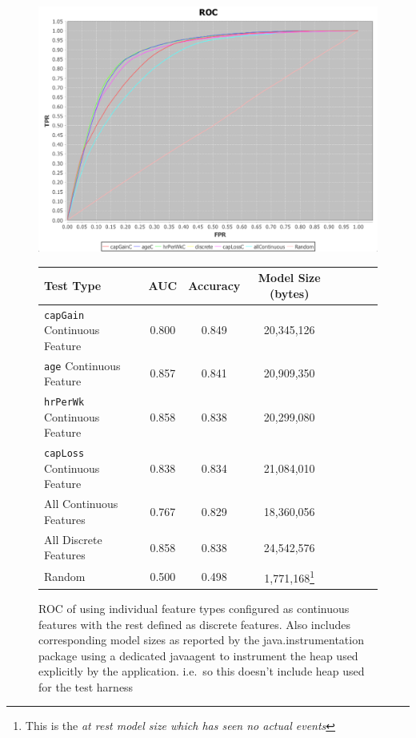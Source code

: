 \documentclass[a4paper,11pt]{scrreprt}
\begin{document}
\begin{figure}[h!]
\centering
\caption{ROC of using individual feature types configured as continuous features with the rest defined as discrete features. Also includes corresponding model sizes as reported by the java.instrumentation package using a dedicated javaagent to instrument the heap used explicitly by the application. i.e.\ so this doesn't include heap used for the test harness}
\includegraphics[scale=0.50, trim=0 -25 0 2, clip=true] {continuous_features_adult_earnings.png}
\label{fig:indexes}
\begin{tabular}{l*{6}{c}r}
Test Type & AUC & Accuracy & Model Size (bytes)\\
\hline
\verb|capGain| Continuous Feature & 0.800 & 0.849 & 20,345,126 & \\
\verb|age| Continuous Feature & 0.857 & 0.841 & 20,909,350\\
\verb|hrPerWk| Continuous Feature & 0.858 & 0.838 & 20,299,080\\
\verb|capLoss| Continuous Feature & 0.838 & 0.834 & 21,084,010\\
All Continuous Features & 0.767 & 0.829 & 18,360,056\\
All Discrete Features & 0.858 & 0.838 & 24,542,576\\
Random & 0.500 & 0.498 & 1,771,168\footnote{This is the \it{at rest} model size which has seen no actual events}
\end{tabular}
\end{figure}
\clearpage
\end{document}
